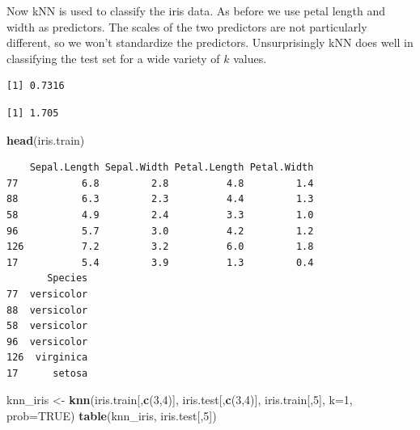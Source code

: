 \documentclass[
]{krantz}
\makeatletter
\newenvironment{Shaded}{\begin{snugshade}}{\end{snugshade}}
\newcommand{\DataTypeTok}[1]{\textcolor[rgb]{0.27,0.27,0.27}{#1}}
\newcommand{\DecValTok}[1]{\textcolor[rgb]{0.06,0.06,0.06}{#1}}
\newcommand{\KeywordTok}[1]{\textcolor[rgb]{0.27,0.27,0.27}{\textbf{#1}}}
\newcommand{\NormalTok}[1]{#1}
\newcommand{\OperatorTok}[1]{\textcolor[rgb]{0.43,0.43,0.43}{\textbf{#1}}}
\newcommand{\OtherTok}[1]{\textcolor[rgb]{0.37,0.37,0.37}{#1}}
\newcommand{\StringTok}[1]{\textcolor[rgb]{0.5,0.5,0.5}{#1}}
\newenvironment{kframe}{%
\medskip{}
\setlength{\fboxsep}{.8em}
 \def\at@end@of@kframe{}%
 \ifinner\ifhmode%
  \def\at@end@of@kframe{\end{minipage}}%
  \begin{minipage}{\columnwidth}%
 \fi\fi%
 \def\FrameCommand##1{\hskip\@totalleftmargin \hskip-\fboxsep
 \colorbox{shadecolor}{##1}\hskip-\fboxsep
     \hskip-\linewidth \hskip-\@totalleftmargin \hskip\columnwidth}%
 \MakeFramed {\advance\hsize-\width
   \@totalleftmargin\z@ \linewidth\hsize
   \@setminipage}}%
 {\par\unskip\endMakeFramed%
 \at@end@of@kframe}
\renewenvironment{Shaded}{\begin{kframe}}{\end{kframe}}
\makeatother
\begin{document}
Now kNN is used to classify the iris data. As before we use petal length and width as predictors. The scales of the two predictors are not particularly different, so we won't standardize the predictors. Unsurprisingly kNN does well in classifying the test set for a wide variety of \(k\) values.

\begin{Shaded}
\end{Shaded}

\begin{verbatim}
[1] 0.7316
\end{verbatim}

\begin{Shaded}
\end{Shaded}

\begin{verbatim}
[1] 1.705
\end{verbatim}

\begin{Shaded}
\begin{Highlighting}[]
\KeywordTok{head}\NormalTok{(iris.train)}
\end{Highlighting}
\end{Shaded}

\begin{verbatim}
    Sepal.Length Sepal.Width Petal.Length Petal.Width
77           6.8         2.8          4.8         1.4
88           6.3         2.3          4.4         1.3
58           4.9         2.4          3.3         1.0
96           5.7         3.0          4.2         1.2
126          7.2         3.2          6.0         1.8
17           5.4         3.9          1.3         0.4
       Species
77  versicolor
88  versicolor
58  versicolor
96  versicolor
126  virginica
17      setosa
\end{verbatim}

\begin{Shaded}
\begin{Highlighting}[]
\NormalTok{knn\_iris \textless{}{-}}\StringTok{ }\KeywordTok{knn}\NormalTok{(iris.train[,}\KeywordTok{c}\NormalTok{(}\DecValTok{3}\NormalTok{,}\DecValTok{4}\NormalTok{)], iris.test[,}\KeywordTok{c}\NormalTok{(}\DecValTok{3}\NormalTok{,}\DecValTok{4}\NormalTok{)], iris.train[,}\DecValTok{5}\NormalTok{], }\DataTypeTok{k=}\DecValTok{1}\NormalTok{, }\DataTypeTok{prob=}\OtherTok{TRUE}\NormalTok{)}
\KeywordTok{table}\NormalTok{(knn\_iris, iris.test[,}\DecValTok{5}\NormalTok{])}
\end{Highlighting}
\end{Shaded}
\end{document}
